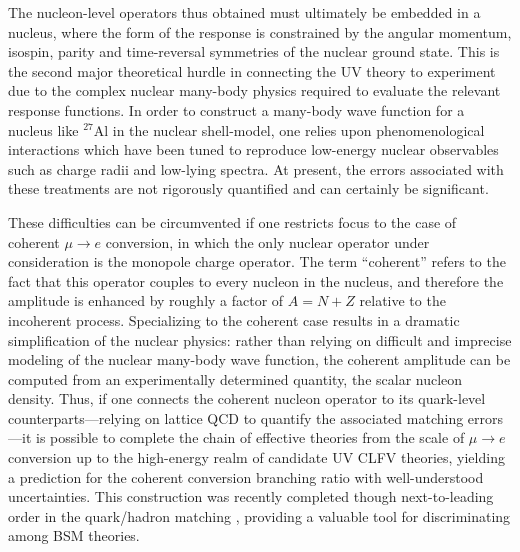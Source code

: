 \documentclass{book}[letterpaper,12pt]
\begin{document}
The nucleon-level operators thus obtained must ultimately be embedded in a nucleus, where the form of the response is constrained by the angular momentum, isospin, parity and time-reversal symmetries of the nuclear ground state. This is the second major theoretical hurdle in connecting the UV theory to experiment due to the complex nuclear many-body physics required to evaluate the relevant response functions. In order to construct a many-body wave function for a nucleus like $^{27}$Al in the nuclear shell-model, one relies upon phenomenological interactions which have been tuned to reproduce low-energy nuclear observables such as charge radii and low-lying spectra. At present, the errors associated with these treatments are not rigorously quantified and can certainly be significant. 

These difficulties can be circumvented if one restricts focus to the case of coherent $\mu\rightarrow e$ conversion, in which the only nuclear operator under consideration is the monopole charge operator. The term ``coherent'' refers to the fact that this operator couples to every nucleon in the nucleus, and therefore the amplitude is enhanced by roughly a factor of $A=N+Z$ relative to the incoherent process. Specializing to the coherent case results in a dramatic simplification of the nuclear physics: rather than relying on difficult and imprecise modeling of the nuclear many-body wave function, the coherent amplitude can be computed from an experimentally determined quantity, the scalar nucleon density. Thus, if one connects the coherent nucleon operator to its quark-level counterparts---relying on lattice QCD to quantify the associated matching errors---it is possible to complete the chain of effective theories from the scale of $\mu\rightarrow e$ conversion up to the high-energy realm of candidate UV CLFV theories, yielding a prediction for the coherent conversion branching ratio with well-understood uncertainties. This construction was recently completed though next-to-leading order in the quark/hadron matching \cite{2018PhRvC..98a5208B,Cirigliano:2022ekw}, providing a valuable tool for discriminating among BSM theories.
\end{document}
